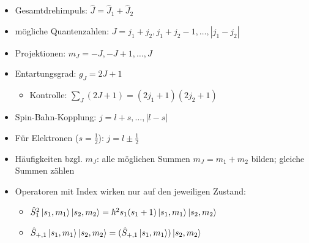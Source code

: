 \documentclass[a4paper,11pt]{article}
\newcommand{\hb}{\hbar}
\begin{document}
\begin{itemize}
\item Gesamtdrehimpuls: $\hat J=\hat J_1+\hat J_2$
\item mögliche Quantenzahlen: $J=j_1+j_2, j_1+j_2-1, \dots,|j_1-j_2|$
\item Projektionen: $m_J=-J,-J+1,\dots,J$
\item Entartungsgrad: $g_J=2J+1$
\begin{itemize}
  \item Kontrolle: $\sum_J(2J+1)=(2j_1+1)(2j_2+1) $
\end{itemize}
\item Spin-Bahn-Kopplung: $j=l+s,\dots,|l-s|$
\item Für Elektronen ($s=\frac12$): $j=l\pm\frac12$
\item Häufigkeiten bzgl. $m_J$: alle möglichen Summen $m_J=m_1+m_2$ bilden; gleiche Summen zählen
\item Operatoren mit Index wirken nur auf den jeweiligen Zustand:

\begin{itemize}
  \item $\hat S_{1}^{2}\ket{s_1,m_1}\ket{s_2,m_2} = \hb^2s_1(s_1+1)\ket{s_1,m_1}\ket{s_2,m_2}$
  \item $\hat S_{+,1}\ket{s_1,m_1}\ket{s_2,m_2} = (\hat S_{+,1}\ket{s_1,m_1})\ket{s_2,m_2} $  
\end{itemize}


\end{itemize}
\end{document}
